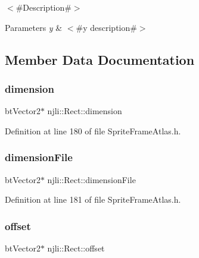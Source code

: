 $<$\#\+Description\#$>$


\begin{DoxyParams}{Parameters}
{\em y} & $<$\#y description\#$>$ \\
\hline
\end{DoxyParams}


\subsection{Member Data Documentation}
\mbox{\label{classnjli_1_1_rect_a1f9f935a849b021e525e470c9b4b27aa}} 
\subsubsection{\texorpdfstring{dimension}{dimension}}
{\footnotesize\ttfamily bt\+Vector2$\ast$ njli\+::\+Rect\+::dimension\hspace{0.3cm}{\ttfamily [private]}}



Definition at line 180 of file Sprite\+Frame\+Atlas.\+h.

\mbox{\label{classnjli_1_1_rect_aa07d368205936a23ab9a47552b4e13c9}} 
\subsubsection{\texorpdfstring{dimension\+File}{dimensionFile}}
{\footnotesize\ttfamily bt\+Vector2$\ast$ njli\+::\+Rect\+::dimension\+File\hspace{0.3cm}{\ttfamily [private]}}



Definition at line 181 of file Sprite\+Frame\+Atlas.\+h.

\mbox{\label{classnjli_1_1_rect_a6f23c542bdc39901ed8fdb494f3be56f}} 
\subsubsection{\texorpdfstring{offset}{offset}}
{\footnotesize\ttfamily bt\+Vector2$\ast$ njli\+::\+Rect\+::offset\hspace{0.3cm}{\ttfamily [private]}}



